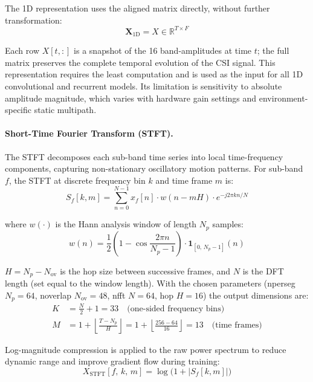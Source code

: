 \documentclass[english,bibtex]{kththesis}
\begin{document}
The 1D representation uses the aligned matrix directly, without further transformation:
\begin{equation}
  \mathbf{X}_\text{1D} = X \in \mathbb{R}^{T \times F}
\end{equation}

Each row $X[t,:]$ is a snapshot of the 16 band-amplitudes at time $t$; the full matrix preserves the complete temporal evolution of the CSI signal. This representation requires the least computation and is used as the input for all 1D convolutional and recurrent models. Its limitation is sensitivity to absolute amplitude magnitude, which varies with hardware gain settings and environment-specific static multipath.

\paragraph{Short-Time Fourier Transform (STFT).}

The STFT decomposes each sub-band time series into local time-frequency components, capturing non-stationary oscillatory motion patterns. For sub-band $f$, the STFT at discrete frequency bin $k$ and time frame $m$ is:
\begin{equation}
  S_f[k,m]
    = \sum_{n=0}^{N-1} x_f[n]\cdot w(n - mH)\cdot e^{-j2\pi kn/N}
\end{equation}

where $w(\cdot)$ is the Hann analysis window of length $N_p$ samples:
\begin{equation}
  w(n) = \frac{1}{2}\!\left(1 - \cos\!\frac{2\pi n}{N_p - 1}\right)\!\cdot\mathbf{1}_{[0,\,N_p{-}1]}(n)
\end{equation}

$H = N_p - N_\text{ov}$ is the hop size between successive frames, and $N$ is the DFT length (set equal to the window length). With the chosen parameters (nperseg $N_p = 64$, noverlap $N_\text{ov} = 48$, nfft $N = 64$, hop $H = 16$) the output dimensions are:
\begin{align}
  K &= \tfrac{N}{2} + 1 = 33 \quad\text{(one-sided frequency bins)} \\
  M &= 1 + \left\lfloor\frac{T - N_p}{H}\right\rfloor
      = 1 + \left\lfloor\frac{256 - 64}{16}\right\rfloor = 13 \quad\text{(time frames)}
\end{align}

Log-magnitude compression is applied to the raw power spectrum to reduce dynamic range and improve gradient flow during training:
\begin{equation}
  X_\text{STFT}[f,\,k,\,m] = \log\!\bigl(1 + |S_f[k,m]|\bigr)
\end{equation}
\end{document}
